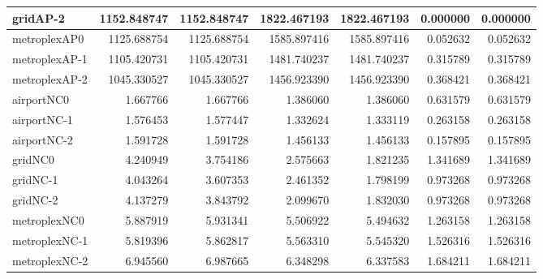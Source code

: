\begin{longtable}{|l|r|r|r|r|r|r|}
gridAP-2 & 1152.848747 & 1152.848747 & 1822.467193 & 1822.467193 & 0.000000 & 0.000000 \\ \hline
metroplexAP0 & 1125.688754 & 1125.688754 & 1585.897416 & 1585.897416 & 0.052632 & 0.052632 \\ \hline
metroplexAP-1 & 1105.420731 & 1105.420731 & 1481.740237 & 1481.740237 & 0.315789 & 0.315789 \\ \hline
metroplexAP-2 & 1045.330527 & 1045.330527 & 1456.923390 & 1456.923390 & 0.368421 & 0.368421 \\ \hline
airportNC0 & 1.667766 & 1.667766 & 1.386060 & 1.386060 & 0.631579 & 0.631579 \\ \hline
airportNC-1 & 1.576453 & 1.577447 & 1.332624 & 1.333119 & 0.263158 & 0.263158 \\ \hline
airportNC-2 & 1.591728 & 1.591728 & 1.456133 & 1.456133 & 0.157895 & 0.157895 \\ \hline
gridNC0 & 4.240949 & 3.754186 & 2.575663 & 1.821235 & 1.341689 & 1.341689 \\ \hline
gridNC-1 & 4.043264 & 3.607353 & 2.461352 & 1.798199 & 0.973268 & 0.973268 \\ \hline
gridNC-2 & 4.137279 & 3.843792 & 2.099670 & 1.832030 & 0.973268 & 0.973268 \\ \hline
metroplexNC0 & 5.887919 & 5.931341 & 5.506922 & 5.494632 & 1.263158 & 1.263158 \\ \hline
metroplexNC-1 & 5.819396 & 5.862817 & 5.563310 & 5.545320 & 1.526316 & 1.526316 \\ \hline
metroplexNC-2 & 6.945560 & 6.987665 & 6.348298 & 6.337583 & 1.684211 & 1.684211 \\ \hline
\end{longtable}
